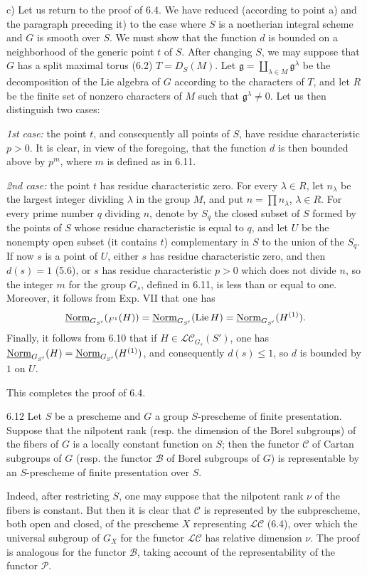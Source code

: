 \noindent c) Let us return to the proof of 6.4. We have reduced (according to point a) and the paragraph preceding it) to the case where $S$ is a noetherian integral scheme and $G$ is smooth over $S$. We must show that the function $d$ is bounded on a neighborhood of the generic point $t$ of $S$. After changing $S$, we may suppose that $G$ has a split maximal torus (6.2) $T=D_S(M)$. Let $\mathfrak g=\coprod_{\lambda\in M}\mathfrak g^\lambda$ be the decomposition of the Lie algebra of $G$ according to the characters of $T$, and let $R$ be the finite set of nonzero characters of $M$ such that $\mathfrak g^\lambda\ne0$. Let us then distinguish two cases:

\noindent\emph{1st case:} the point $t$, and consequently all points of $S$, have residue characteristic $p>0$. It is clear, in view of the foregoing, that the function $d$ is then bounded above by $p^m$, where $m$ is defined as in 6.11.

\noindent\emph{2nd case:} the point $t$ has residue characteristic zero. For every $\lambda\in R$, let $n_\lambda$ be the largest integer dividing $\lambda$ in the group $M$, and put $n=\prod n_\lambda$, $\lambda\in R$. For every prime number $q$ dividing $n$, denote by $S_q$ the closed subset of $S$ formed by the points of $S$ whose residue characteristic is equal to $q$, and let $U$ be the nonempty open subset (it contains $t$) complementary in $S$ to the union of the $S_q$. If now $s$ is a point of $U$, either $s$ has residue characteristic zero, and then $d(s)=1$ (5.6), or $s$ has residue characteristic $p>0$ which does not divide $n$, so the integer $m$ for the group $G_s$, defined in 6.11, is less than or equal to one. Moreover, it follows from Exp. VII that one has
\[
\underline{\mathrm{Norm}}_{G_{S'}}({}_{F^1}(H))=\underline{\mathrm{Norm}}_{G_{S'}}(\operatorname{Lie} H)=\underline{\mathrm{Norm}}_{G_{S'}}(H^{(1)}).
\]
Finally, it follows from 6.10 that if $H\in\mathscr{LC}_{G_s}(S')$, one has $\underline{\mathrm{Norm}}_{G_{S'}}(H)=\underline{\mathrm{Norm}}_{G_{S'}}(H^{(1)})$, and consequently $d(s)\leq1$, so $d$ is bounded by $1$ on $U$.

This completes the proof of 6.4.
\begin{corollary}{6.12}\label{XV.6.12}
Let $S$ be a prescheme and $G$ a group $S$-prescheme of finite presentation. Suppose that the nilpotent rank (resp. the dimension of the Borel subgroups) of the fibers of $G$ is a locally constant function on $S$; then the functor $\mathscr C$ of Cartan subgroups of $G$ (resp. the functor $\mathscr B$ of Borel subgroups of $G$) is representable by an $S$-prescheme of finite presentation over $S$.
\end{corollary}
Indeed, after restricting $S$, one may suppose that the nilpotent rank $\nu$ of the fibers is constant. But then it is clear that $\mathscr C$ is represented by the subprescheme, both open and closed, of the prescheme $X$ representing $\mathscr{LC}$ (6.4), over which the universal subgroup of $G_X$ for the functor $\mathscr{LC}$ has relative dimension $\nu$. The proof is analogous for the functor $\mathscr B$, taking account of the representability of the functor $\mathscr P$.

